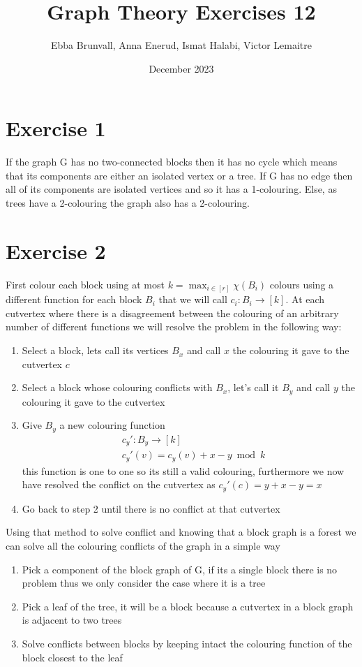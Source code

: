 \documentclass{article}
\title{Graph Theory Exercises 12}
\author{Ebba Brunvall, Anna Enerud, Ismat Halabi, Victor Lemaitre}
\date{December 2023}
\begin{document}
\maketitle

\section*{Exercise 1}
If the graph G has no two-connected blocks then it has no cycle which means that its components are either an isolated vertex or a tree. If G has no edge then all of its components are isolated vertices and so it has a 1-colouring. Else, as trees have a 2-colouring the graph also has a 2-colouring. 

\section*{Exercise 2}
First colour each block using at most $k = \max_{i\in[r]} \chi(B_i)$ colours using a different function for each block $B_i$ that we will call $c_i : B_i \rightarrow [k]$.
At each cutvertex where there is a disagreement between the colouring of an arbitrary number of different functions we will resolve the problem in the following way:
\begin{enumerate}
\item Select a block, lets call its vertices $B_x$ and call $x$ the colouring it gave to the cutvertex $c$
\item Select a block whose colouring conflicts with $B_x$, let's call it $B_y$ and call $y$ the colouring it gave to the cutvertex
\item Give $B_y$ a new colouring function  
\begin{align*} 
&c_y' : B_y \rightarrow [k] \\ 
&c_y'(v) = c_y(v) + x-y \bmod{k}
\end{align*}
this function is one to one so its still a valid colouring, furthermore we now have resolved the conflict on the cutvertex as $c_y'(c) = y + x - y = x$
\item Go back to step 2 until there is no conflict at that cutvertex
\end{enumerate}

Using that method to solve conflict and knowing that a block graph is a forest we can solve all the colouring conflicts of the graph in a simple way 
\begin{enumerate}
\item Pick a component of the block graph of G, if its a single block there is no problem thus we only consider the case where it is a tree
\item Pick a leaf of the tree, it will be a block because a cutvertex in a block graph is adjacent to two trees
\item Solve conflicts between blocks by keeping intact the colouring function of the block closest to the leaf

\end{enumerate}
\end{document}
